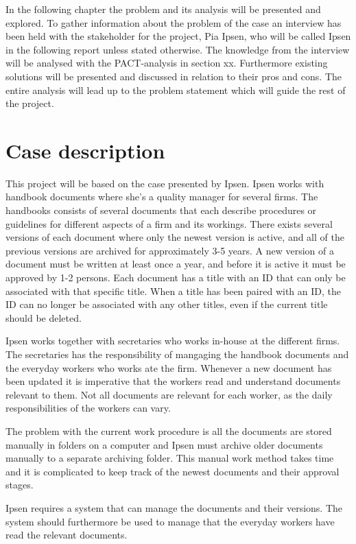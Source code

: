 In the following chapter the problem and its analysis will be presented and explored. 
To gather information about the problem of the case an interview has been held with the stakeholder for the project, Pia Ipsen, who will be called Ipsen in the following report unless stated otherwise.
The knowledge from the interview will be analysed with the PACT-analysis in section xx.
Furthermore existing solutions will be presented and discussed in relation to their pros and cons.
The entire analysis will lead up to the problem statement which will guide the rest of the project.

\section{Case description} \label{case}

This project will be based on the case presented by Ipsen.
Ipsen works with handbook documents where she's a quality manager for several firms.
The handbooks consists of several documents that each describe procedures or guidelines for different aspects of a firm and its workings.
There exists several versions of each document where only the newest version is active, and all of the previous versions are archived for approximately 3-5 years.
A new version of a document must be written at least once a year, and before it is active it must be approved by 1-2 persons.
Each document has a title with an ID that can only be associated with that specific title. 
When a title has been paired with an ID, the ID can no longer be associated with any other titles, even if the current title should be deleted.

Ipsen works together with secretaries who works in-house at the different firms.
The secretaries has the responsibility of mangaging the handbook documents and the everyday workers who works ate the firm.
Whenever a new document has been updated it is imperative that the workers read and understand documents relevant to them.
Not all documents are relevant for each worker, as the daily responsibilities of the workers can vary.

The problem with the current work procedure is all the documents are stored manually in folders on a computer and Ipsen must archive older documents manually to a separate archiving folder. This manual work method takes time and it is complicated to keep track of the newest documents and their approval stages.

Ipsen requires a system that can manage the documents and their versions.
The system should furthermore be used to manage that the everyday workers have read the relevant documents.